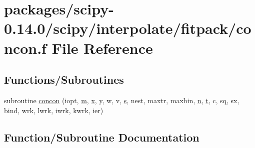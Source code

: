 \hypertarget{concon_8f}{}\section{packages/scipy-\/0.14.0/scipy/interpolate/fitpack/concon.f File Reference}
\label{concon_8f}
\subsection*{Functions/\+Subroutines}
\begin{DoxyCompactItemize}
\item 
subroutine \hyperlink{concon_8f_ab994585b7d7b791ca92a77eff4a6bb69}{concon} (iopt, \hyperlink{indexexpr_8h_ab72fdb4031d47b75ab26dd18a437bcdc}{m}, \hyperlink{vecnorm1_8cc_ac73eed9e41ec09d58f112f06c2d6cb63}{x}, y, w, v, \hyperlink{indexexpr_8h_ae024b0db549122b44c349ae28ec990dc}{s}, nest, maxtr, maxbin, \hyperlink{indexexpr_8h_ab427e2e2b4d6cec55fa088ea2a692ace}{n}, \hyperlink{indexexpr_8h_a01709998b82be3f34e0412206618d09d}{t}, c, sq, sx, bind, wrk, lwrk, iwrk, kwrk, ier)
\end{DoxyCompactItemize}


\subsection{Function/\+Subroutine Documentation}
\hypertarget{concon_8f_ab994585b7d7b791ca92a77eff4a6bb69}{}
